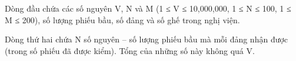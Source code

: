 Dòng đầu chứa các số nguyên V, N và M (1 ≤ V ≤ 10,000,000, 1 ≤ N ≤ 100, 1 ≤ M ≤ 200), số lượng phiếu bầu, số đảng và số ghế trong nghị viện.  

   Dòng thứ hai chứa N số nguyên – số lượng phiếu bầu mà mỗi đảng nhận được (trong số phiếu đã được kiểm). Tổng của những số này không quá V.  

\